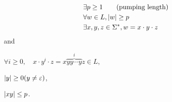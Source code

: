 \begin{definition}[Property $P$]
    \begin{align*}
        &\exists p \ge 1 \qquad \text{(pumping length)}     \\
        &\forall w \in L, { \left\lvert w \right\rvert } \ge p                     \\
        &\exists x,y,z \in \Sigma^*, w = x \cdot y \cdot z
    \end{align*}
    and
    \begin{compactitem}
    \item
        $
        \forall i \ge 0, \quad
        x \cdot y^i \cdot z = x \overbrace{yy \cdots y}^i z \in L
        $,
    \item
        $
        { \left\lvert y \right\rvert } \ge 0 ( y \neq \varepsilon )
        $,
    \item
        $
        { \left\lvert xy \right\rvert } \le p
        $.
    \end{compactitem}
\end{definition}

